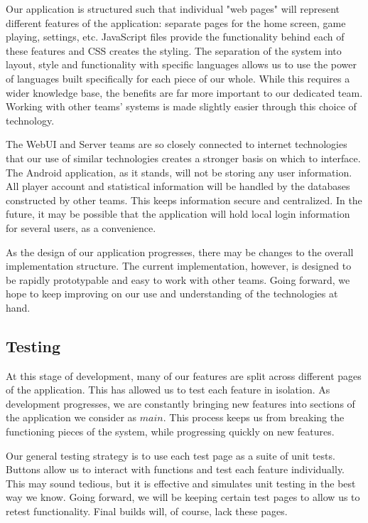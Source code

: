 \documentclass[12pt]{article}
\begin{document}
Our application is structured such that individual "web pages" will represent different features of the application: separate pages for the home screen, game playing, settings, etc.  JavaScript files provide the functionality behind each of these features and CSS creates the styling.  The separation of the system into layout, style and functionality with specific languages allows us to use the power of languages built specifically for each piece of our whole.  While this requires a wider knowledge base, the benefits are far more important to our dedicated team.  Working with other teams' systems is made slightly easier through this choice of technology.

The WebUI and Server teams are so closely connected to internet technologies that our use of similar technologies creates a stronger basis on which to interface.  The Android application, as it stands, will not be storing any user information.  All player account and statistical information will be handled by the databases constructed by other teams.  This keeps information secure and centralized.  In the future, it may be possible that the application will hold local login information for several users, as a convenience.  

As the design of our application progresses, there may be changes to the overall implementation structure.  The current implementation, however, is designed to be rapidly prototypable and easy to work with other teams.  Going forward, we hope to keep improving on our use and understanding of the technologies at hand.


\subsection{Testing}
At this stage of development, many of our features are split across different pages of the application.  This has allowed us to test each feature in isolation.  As development progresses, we are constantly bringing new features into sections of the application we consider as $main$.  This process keeps us from breaking the functioning pieces of the system, while progressing quickly on new features.

Our general testing strategy is to use each test page as a suite of unit tests.  Buttons allow us to interact with functions and test each feature individually.  This may sound tedious, but it is effective and simulates unit testing in the best way we know.  Going forward, we will be keeping certain test pages to allow us to retest functionality.  Final builds will, of course, lack these pages.
\end{document}
